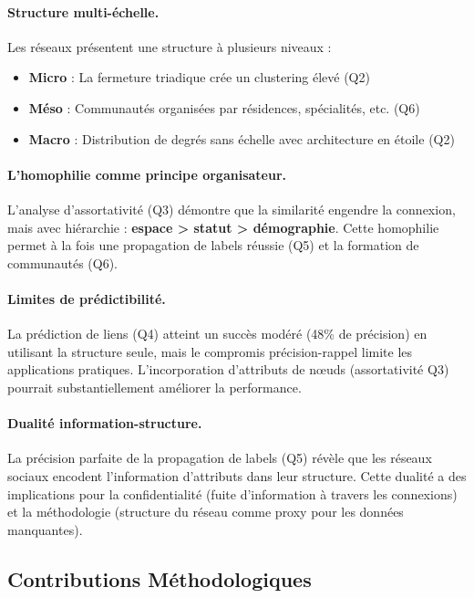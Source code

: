 \documentclass[12pt,a4paper]{article}
\begin{document}
\paragraph{Structure multi-échelle.} Les réseaux présentent une structure à plusieurs niveaux :
\begin{itemize}
    \item \textbf{Micro} : La fermeture triadique crée un clustering élevé (Q2)
    \item \textbf{Méso} : Communautés organisées par résidences, spécialités, etc. (Q6)
    \item \textbf{Macro} : Distribution de degrés sans échelle avec architecture en étoile (Q2)
\end{itemize}

\paragraph{L'homophilie comme principe organisateur.} L'analyse d'assortativité (Q3) démontre que la similarité engendre la connexion, mais avec hiérarchie : \textbf{espace > statut > démographie}. Cette homophilie permet à la fois une propagation de labels réussie (Q5) et la formation de communautés (Q6).

\paragraph{Limites de prédictibilité.} La prédiction de liens (Q4) atteint un succès modéré (48\% de précision) en utilisant la structure seule, mais le compromis précision-rappel limite les applications pratiques. L'incorporation d'attributs de nœuds (assortativité Q3) pourrait substantiellement améliorer la performance.

\paragraph{Dualité information-structure.} La précision parfaite de la propagation de labels (Q5) révèle que les réseaux sociaux encodent l'information d'attributs dans leur structure. Cette dualité a des implications pour la confidentialité (fuite d'information à travers les connexions) et la méthodologie (structure du réseau comme proxy pour les données manquantes).

\subsection{Contributions Méthodologiques}
\end{document}

